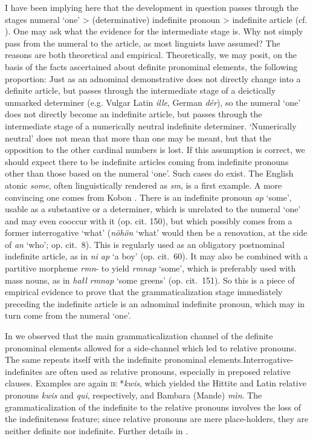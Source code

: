 I have been implying here that the development in question passes through the stages numeral ‘one’ {\textgreater} (determinative) indefinite pronoun {\textgreater} indefinite article (cf. \citealt[273]{HeineEtAl1984}). One may ask what the evidence for the intermediate stage is. Why not simply pass from the numeral to the article, as most linguists have assumed? The reasons are both theoretical and empirical. Theoretically, we may posit, on the basis of the facts ascertained about definite pronominal elements, the following proportion: Just as an adnominal demonstrative does not directly change into a definite article, but passes through the intermediate stage of a deictically unmarked determiner (e.g. Vulgar Latin \textit{ille}, German \textit{dér}), so the numeral ‘one’ does not directly become an indefinite article, but passes through the intermediate stage of a numerically neutral indefinite determiner. ‘Numerically neutral’ does not mean that more than one may be meant, but that the opposition to the other cardinal numbers is lost. If this assumption is correct, we should expect there to be indefinite articles coming from indefinite pronouns other than those based on the numeral ‘one’. Such cases do exist. The English atonic \textit{some}, often linguistically rendered as \textit{sm}, is a first example. A more convincing one comes from Kobon \citep{Davies1981}. There is an indefinite pronoun \textit{ap} ‘some’, usable as a substantive or a determiner, which is unrelated to the numeral ‘one’ and may even cooccur with it (op. cit. 150), but which possibly comes from a former interrogative ‘what’ (\textit{nöhön} ‘what’ would then be a renovation, at the side of \textit{an} ‘who’; op. cit.~8). This is regularly used as an obligatory postnominal indefinite article, as in \textit{ni ap} ‘a boy’ (op. cit.~60). It may also be combined with a partitive morpheme \textit{rmn}{}- to yield \textit{rmnap} ‘some’, which is preferably used with mass nouns, as in \textit{hałl rmnap} ‘some greens’ (op. cit.~151). So this is a piece of empirical evidence to prove that the grammaticalization stage immediately preceding the indefinite article is an adnominal indefinite pronoun, which may in turn come from the numeral ‘one’.

In  we observed that the main grammaticalization channel of the definite pronominal elements allowed for a side-channel which led to relative pronouns. The same repeats itself with the indefinite pronominal elements.\linebreak Interrogative-indefinites are often used as relative pronouns, especially in preposed relative clauses. Examples are again \textsc{ie} *\textit{kwis}, which yielded the Hittite and Latin relative pronouns \textit{kwis} and \textit{qui}, respectively, and Bambara (Mande) \textit{mìn}. The grammaticalization of the indefinite to the relative pronouns involves the loss of the indefiniteness feature; since relative pronouns are mere place-holders, they are neither definite nor indefinite. Further details in \citet[Ch.~V.2.3, §2]{Lehmann1984}.

